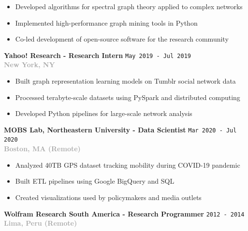 \documentclass[11pt,a4paper]{article}
\newcommand{\verdigrisbullet}{{\color{verdigris}$\bullet$}\space}
\newcommand{\jobduration}[1]{%
    \textcolor{mediumgray}{\texttt{\small #1}}%
}
\newcommand{\companyname}[1]{%
    \textcolor{darkgray}{\textbf{#1}}%
}
\begin{document}
\begin{itemize}[leftmargin=15pt,itemsep=3pt]
    \item[\verdigrisbullet] Developed algorithms for spectral graph theory applied to complex networks
    \item[\verdigrisbullet] Implemented high-performance graph mining tools in Python
    \item[\verdigrisbullet] Co-led development of open-source software for the research community
\end{itemize}

\vspace{8pt}

\textbf{\large\color{navy}Yahoo! Research - Research Intern} \hfill \jobduration{May 2019 - Jul 2019}\\
\companyname{New York, NY}

\begin{itemize}[leftmargin=15pt,itemsep=3pt]
    \item[\verdigrisbullet] Built graph representation learning models on Tumblr social network data
    \item[\verdigrisbullet] Processed terabyte-scale datasets using PySpark and distributed computing
    \item[\verdigrisbullet] Developed Python pipelines for large-scale network analysis
\end{itemize}

\vspace{8pt}

\textbf{\large\color{navy}MOBS Lab, Northeastern University - Data Scientist} \hfill \jobduration{Mar 2020 - Jul 2020}\\
\companyname{Boston, MA (Remote)}

\begin{itemize}[leftmargin=15pt,itemsep=3pt]
    \item[\verdigrisbullet] Analyzed 40TB GPS dataset tracking mobility during COVID-19 pandemic
    \item[\verdigrisbullet] Built ETL pipelines using Google BigQuery and SQL
    \item[\verdigrisbullet] Created visualizations used by policymakers and media outlets
\end{itemize}

\vspace{8pt}

\textbf{\large\color{navy}Wolfram Research South America - Research Programmer} \hfill \jobduration{2012 - 2014}\\
\companyname{Lima, Peru (Remote)}
\end{document}
